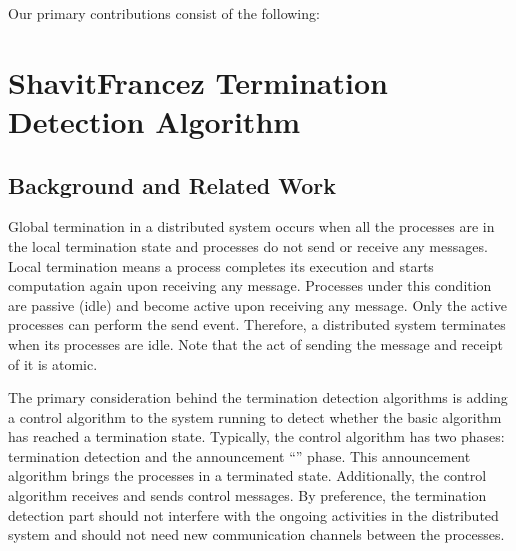 \documentclass[letterpaper,10pt,english]{sphinxmanual}
\begin{document}
\sphinxAtStartPar
Our primary contributions consist of the following:

\sphinxstepscope


\section{Shavit\sphinxhyphen{}Francez Termination Detection Algorithm}
\label{\detokenize{docs/ShavitFrancezAlg/algorithm:shavitfrancezalg}}\label{\detokenize{docs/ShavitFrancezAlg/algorithm::doc}}

\subsection{Background and Related Work}
\label{\detokenize{docs/ShavitFrancezAlg/algorithm:background-and-related-work}}
\sphinxAtStartPar
Global termination in a distributed system occurs when all the processes are in the local termination state and processes do not send or receive any messages. Local termination means a process completes its execution and starts computation again upon receiving any message. Processes under this condition are passive (idle) and become active upon receiving any message. Only the active processes can perform the send event. Therefore, a distributed system terminates when its processes are idle. Note that the act of sending the message and receipt of it is atomic.

\sphinxAtStartPar
The primary consideration behind the termination detection algorithms is adding a control algorithm to the system running to detect whether the basic algorithm has reached a termination state.  Typically, the control algorithm has two phases: termination detection and the announcement “” phase. This announcement algorithm brings the processes in a terminated state. Additionally, the control algorithm receives and sends control messages.  By preference, the termination detection part should not interfere with the ongoing activities in the distributed system and should not need new communication channels between the processes.
\end{document}
